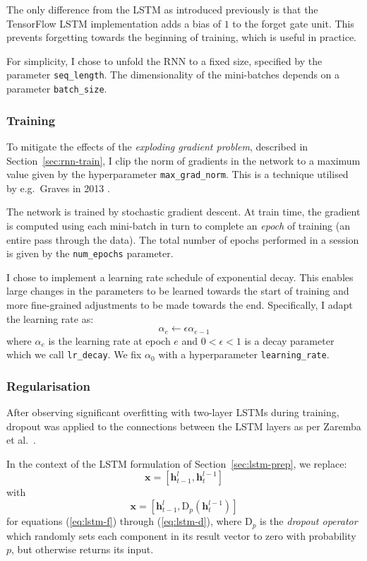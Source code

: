 \documentclass[12pt,a4paper,twoside,openright]{report}
\newcommand{\sref}[1]{Section~\ref{#1}}
\newcommand{\vect}[1]{\boldsymbol{\mathbf{#1}}}
\begin{document}
The only difference from the LSTM as introduced previously is that the
TensorFlow LSTM implementation adds a bias of $1$ to the forget gate unit. This
prevents forgetting towards the beginning of training, which is useful in
practice.

For simplicity, I chose to unfold the RNN to a fixed size, specified by the
parameter \texttt{seq\_length}. The dimensionality of the mini-batches depends
on a parameter \texttt{batch\_size}.

\subsubsection{Training}

To mitigate the effects of the \emph{exploding gradient problem}, described in
\sref{sec:rnn-train}, I clip the norm of gradients in the network to a
maximum value given by the hyperparameter \texttt{max\_grad\_norm}. This is a
technique utilised by e.g.\ Graves in 2013 \cite{graves2013generating}.

The network is trained by stochastic gradient descent. At train time, the
gradient is computed using each mini-batch in turn to complete an \emph{epoch}
of training (an entire pass through the data). The total number of epochs
performed in a session is given by the \texttt{num\_epochs} parameter.

I chose to implement a learning rate schedule of exponential decay. This enables
large changes in the parameters to be learned towards the start of training and
more fine-grained adjustments to be made towards the end. Specifically, I adapt
the learning rate as:
$$ \alpha_e \gets \epsilon\alpha_{e-1} $$
where $\alpha_e$ is the learning rate at epoch $e$ and $0 < \epsilon < 1$ is a
decay parameter which we call \texttt{lr\_decay}. We fix $\alpha_0$ with a
hyperparameter \texttt{learning\_rate}.

\subsubsection{Regularisation}

After observing significant overfitting with two-layer LSTMs during training,
dropout was applied to the connections between the LSTM layers as per Zaremba et
al.\ \cite{zaremba2014recurrent}.

In the context of the LSTM formulation of \sref{sec:lstm-prep}, we
replace:
$$ \vect{x} = [\vect{h}_{t-1}^l, \vect{h}_t^{l-1}] $$
with
$$ \vect{x} = [\vect{h}_{t-1}^l, \mathrm{D}_p(\vect{h}_t^{l-1})] $$
for equations (\ref{eq:lstm-f}) through (\ref{eq:lstm-d}), where $\mathrm{D}_p$
is the \emph{dropout operator} which randomly sets each component in its result
vector to zero with probability $p$, but otherwise returns its input. 
\end{document}
